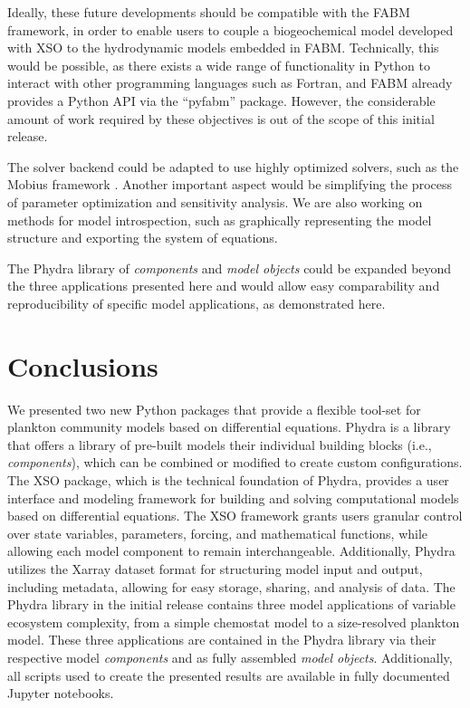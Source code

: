 \documentclass[gmd, manuscript]{copernicus}
\begin{document}
Ideally, these future developments should be compatible with the FABM framework, in order to enable users to couple a biogeochemical model developed with XSO to the hydrodynamic models embedded in FABM. Technically, this would be possible, as there exists a wide range of functionality in Python to interact with other programming languages such as Fortran, and FABM already provides a Python API via the “pyfabm” package. However, the considerable amount of work required by these objectives is out of the scope of this initial release.

The solver backend could be adapted to use highly optimized solvers, such as the Mobius framework \citep{Norling2021RapidV1.0}. Another important aspect would be simplifying the process of parameter optimization and sensitivity analysis. We are also working on methods for model introspection, such as graphically representing the model structure and exporting the system of equations. 

The Phydra library of \textit{components} and \textit{model objects} could be expanded beyond the three applications presented here and would allow easy comparability and reproducibility of specific model applications, as demonstrated here.


\section{Conclusions}

We presented two new Python packages that provide a flexible tool-set for plankton community models based on differential equations. Phydra is a library that offers a library of pre-built models their individual building blocks (i.e., \textit{components}), which can be combined or modified to create custom configurations. The XSO package, which is the technical foundation of Phydra, provides a user interface and modeling framework for building and solving computational models based on differential equations. The XSO framework grants users granular control over state variables, parameters, forcing, and mathematical functions, while allowing each model component to remain interchangeable. Additionally, Phydra utilizes the Xarray dataset format for structuring model input and output, including metadata, allowing for easy storage, sharing, and analysis of data. The Phydra library in the initial release contains three model applications of variable ecosystem complexity, from a simple chemostat model to a size-resolved plankton model. These three applications are contained in the Phydra library via their respective model \textit{components} and as fully assembled \textit{model objects}. Additionally, all scripts used to create the presented results are available in fully documented Jupyter notebooks.
\end{document}
